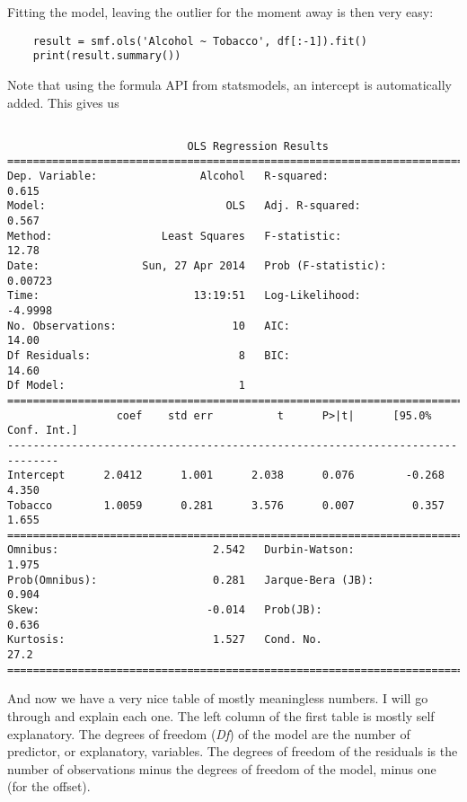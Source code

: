 Fitting the model, leaving the outlier for the moment away is then very easy:

\begin{lstlisting}
    result = smf.ols('Alcohol ~ Tobacco', df[:-1]).fit()
    print(result.summary())
\end{lstlisting}

Note that using the formula API from statsmodels, an intercept is automatically added.  This gives us
\small\begin{lstlisting}

                            OLS Regression Results
==============================================================================
Dep. Variable:                Alcohol   R-squared:                       0.615
Model:                            OLS   Adj. R-squared:                  0.567
Method:                 Least Squares   F-statistic:                     12.78
Date:                Sun, 27 Apr 2014   Prob (F-statistic):            0.00723
Time:                        13:19:51   Log-Likelihood:                -4.9998
No. Observations:                  10   AIC:                             14.00
Df Residuals:                       8   BIC:                             14.60
Df Model:                           1
==============================================================================
                 coef    std err          t      P>|t|      [95.0% Conf. Int.]
------------------------------------------------------------------------------
Intercept      2.0412      1.001      2.038      0.076        -0.268     4.350
Tobacco        1.0059      0.281      3.576      0.007         0.357     1.655
==============================================================================
Omnibus:                        2.542   Durbin-Watson:                   1.975
Prob(Omnibus):                  0.281   Jarque-Bera (JB):                0.904
Skew:                          -0.014   Prob(JB):                        0.636
Kurtosis:                       1.527   Cond. No.                         27.2
==============================================================================
\end{lstlisting}
\normalsize


And now we have a very nice table of mostly meaningless numbers. I will go through and explain each one. The left column of the first table is mostly self explanatory. The degrees of freedom (\emph{Df}) of the model are the number of predictor, or explanatory, variables. The degrees of freedom of the residuals is the number of observations minus the degrees of freedom of the model, minus one (for the offset).

